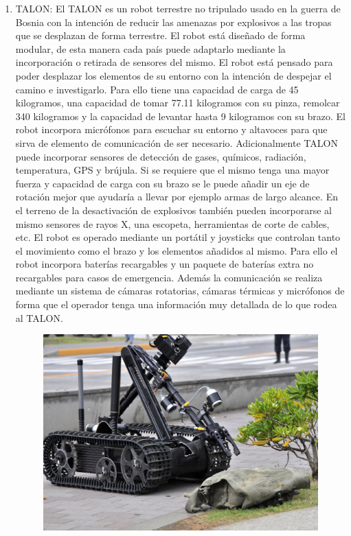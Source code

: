 \begin{enumerate}
  \item TALON: El TALON es un robot terrestre no tripulado usado en la guerra de Bosnia con la intención de reducir las amenazas por explosivos a las tropas que se desplazan de forma terrestre. El robot está diseñado de forma modular, de esta manera cada país puede adaptarlo mediante la incorporación o retirada de sensores del mismo. El robot está pensado para poder desplazar los elementos de su entorno con la intención de despejar el camino e investigarlo. Para ello tiene una capacidad de carga de 45 kilogramos, una capacidad de tomar 77.11 kilogramos con su pinza, remolcar 340 kilogramos y la capacidad de levantar hasta 9 kilogramos con su brazo. El robot incorpora micrófonos para escuchar su entorno y altavoces para que sirva de elemento de comunicación de ser necesario. Adicionalmente TALON puede incorporar sensores de detección de gases, químicos, radiación, temperatura, GPS y brújula. Si se requiere que el mismo tenga una mayor fuerza y capacidad de carga con su brazo se le puede añadir un eje de rotación mejor que ayudaría a llevar por ejemplo armas de largo alcance. En el terreno de la desactivación de explosivos también pueden incorporarse al mismo sensores de rayos X, una escopeta, herramientas de corte de cables, etc. El robot es operado mediante un portátil y joysticks que controlan tanto el movimiento como el brazo y los elementos añadidos al mismo. Para ello el robot incorpora baterías recargables y un paquete de baterías extra no recargables para casos de emergencia. Además la comunicación se realiza mediante un sistema de cámaras rotatorias, cámaras térmicas y micrófonos de forma que el operador tenga una información muy detallada de lo que rodea al TALON.
  \begin{figure}[!h]
  	\centering
  	\includegraphics[scale=0.5]{./EtapaModerna/Imagenes/talon.jpg}

\end{figure}
\end{enumerate}
